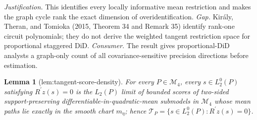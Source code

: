 \documentclass{article}
\newtheorem{lemma}{Lemma}
\begin{document}
\par\smallskip\noindent \textit{Justification.} This identifies every locally informative mean restriction and makes the graph cycle rank the exact dimension of overidentification. \textit{Gap.} Király, Theran, and Tomioka (2015, Theorem 34 and Remark 35) identify rank-one circuit polynomials; they do not derive the weighted tangent restriction space for proportional staggered DiD. \textit{Consumer.} The result gives proportional-DiD analysts a graph-only count of all covariance-sensitive precision directions before estimation.

\begin{lemma}[lem:tangent-score-density]\label{lem:tangent-score-density}
For every \(P\in\mathcal M_4\), every \(s\in L_2^0(P)\) satisfying \(R^{\prime}z(s)=0\) is the \(L_2(P)\) limit of bounded scores of two-sided support-preserving differentiable-in-quadratic-mean submodels in \(\mathcal M_4\) whose mean paths lie exactly in the smooth chart \(m_{\eta}\); hence \(\mathcal T_P=\{s\in L_2^0(P):R^{\prime}z(s)=0\}\).
\end{lemma}
\end{document}
